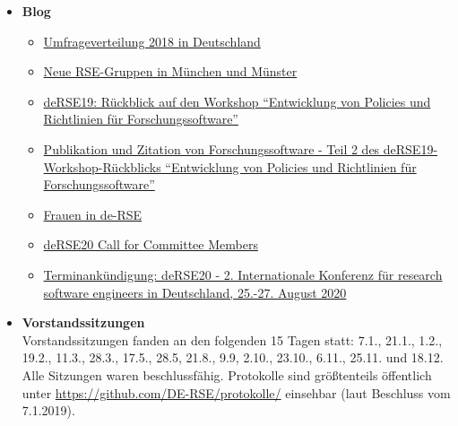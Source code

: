 \begin{itemize}
 \item \textbf{Blog}
 \begin{itemize}
  \item \href{https://www.de-rse.org/blog/2019/01/29/umfrageverteilung-2018-in-deutschland.html}{Umfrageverteilung 2018 in Deutschland}
  \item \href{https://www.de-rse.org/blog/2019/02/26/new-rse-groups-meet-in-munich-and-muenster.html}{Neue RSE-Gruppen in München und Münster}
  \item \href{https://de-rse.org/blog/2019/07/10/derse19-ws-policies-1.html}{deRSE19: Rückblick auf den Workshop ``Entwicklung von Policies und Richtlinien für Forschungssoftware''}
  \item \href{https://de-rse.org/blog/2019/07/26/derse19-ws-policies-2.html}{Publikation und Zitation von Forschungssoftware - Teil 2 des deRSE19-Workshop-Rückblicks ``Entwicklung von Policies und Richtlinien für Forschungssoftware''}
  \item \href{https://de-rse.org/blog/2019/10/22/frauen-in-derse.html}{Frauen in de-RSE}
  \item \href{https://de-rse.org/blog/2019/11/01/derse20-call-for-committee-members.html}{deRSE20 Call for Committee Members}
  \item \href{https://de-rse.org/blog/2019/12/20/derse20-terminankuendigung.html}{Terminankündigung: deRSE20 - 2. Internationale Konferenz für research software engineers in Deutschland, 25.-27. August 2020}
 \end{itemize}
 \item \textbf{Vorstandssitzungen}\\
  Vorstandssitzungen fanden an den folgenden 15 Tagen statt: 7.1., 21.1., 1.2., 19.2., 11.3., 28.3., 17.5., 28.5, 21.8., 9.9, 2.10., 23.10., 6.11., 25.11. und 18.12. Alle Sitzungen waren beschlussfähig. Protokolle sind größtenteils öffentlich unter \href{https://github.com/DE-RSE/protokolle/}{https://github.com/DE-RSE/protokolle/} einsehbar (laut Beschluss vom 7.1.2019).
\end{itemize}





